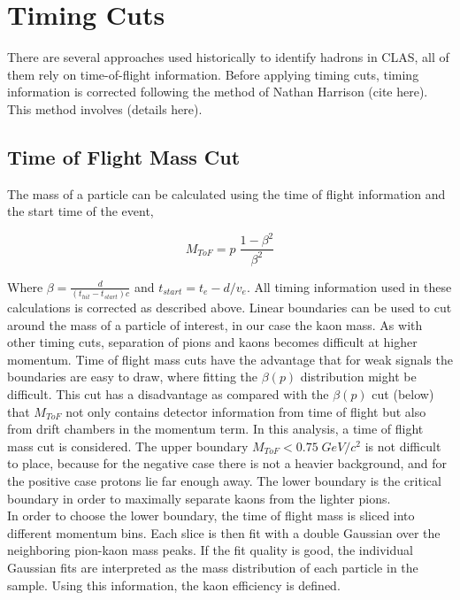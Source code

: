 \section{Timing Cuts}

There are several approaches used historically to identify hadrons in CLAS, all of them rely on time-of-flight information.  Before applying timing cuts, timing information is corrected following the method of Nathan Harrison (cite here).  This method involves (details here).   \\

\subsection{Time of Flight Mass Cut}

The mass of a particle can be calculated using the time of flight information and the start time of the event,

\begin{equation}
  M_{ToF} = p \; \frac{1 - \beta^2}{\beta^2}
\end{equation}

Where $\beta = \frac{d}{(t_{hit}-t_{start}) c}$ and $t_{start} = t_{e} - d/v_{e}$.  All timing information used in these calculations is corrected as described above.  Linear boundaries can be used to cut around the mass of a particle of interest, in our case the kaon mass.  As with other timing cuts, separation of pions and kaons becomes difficult at higher momentum.  Time of flight mass cuts have the advantage that for weak signals the boundaries are easy to draw, where fitting the $\beta (p)$ distribution might be difficult.  This cut has a disadvantage as compared with the $\beta (p)$ cut (below) that $M_{ToF}$ not only contains detector information from time of flight but also from drift chambers in the momentum term.  In this analysis, a time of flight mass cut is considered.  The upper boundary $M_{ToF} < 0.75 \; GeV/c^{2}$ is not difficult to place, because for the negative case there is not a heavier background, and for the positive case protons lie far enough away.  The lower boundary is the critical boundary in order to maximally separate kaons from the lighter pions.  \\

In order to choose the lower boundary, the time of flight mass is sliced into different momentum bins.  Each slice is then fit with a double Gaussian over the neighboring pion-kaon mass peaks.  If the fit quality is good, the individual Gaussian fits are interpreted as the mass distribution of each particle in the sample.  Using this information, the kaon efficiency is defined.

